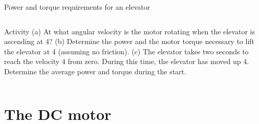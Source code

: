\documentclass[presentation,aspectratio=169]{beamer}
\begin{document}
\begin{frame}[label={sec:org07221cf}]{Power and torque requirements for an elevator}
\begin{columns}
\begin{column}{0.72\columnwidth}
 \alert{Activity} 
\alert{(a)} At what angular velocity is the motor rotating when the elevator is ascending at \unit{4}{\meter\per\second}? \alert{(b)} Determine the power and the motor torque necessary to lift the elevator at \unit{4}{\meter\per\second} (assuming no friction). \alert{(c)} The elevator takes two seconds to reach the velocity \unit{4}{\meter\per\second} from zero. During this time, the elevator has moved up \unit{4}{\meter}. Determine the average power and torque during the start.
\end{column}
\end{columns}
\end{frame}

\section{The DC motor}
\label{sec:org10af172}
\end{document}
